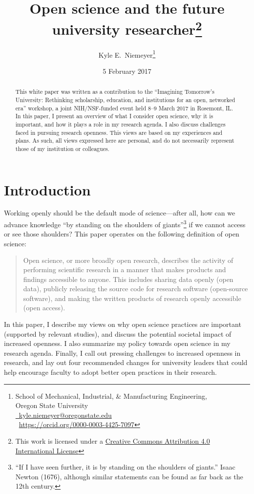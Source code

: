 \documentclass[nobib]{tufte-handout}
\title{Open science and the future university researcher\thanks{This
work is licensed under a
\href{https://creativecommons.org/licenses/by/4.0/}{Creative Commons Attribution
4.0 International License} \ccby}}
\author[Kyle E.~Niemeyer]{Kyle E.~Niemeyer\thanks{
School of Mechanical, Industrial, \& Manufacturing Engineering,\\
\noindent Oregon State University\\
\noindent \href{mailto:kyle.niemeyer@oregonstate.edu}{\faEnvelopeO{}~kyle.niemeyer@oregonstate.edu}\\
\noindent \href{https://orcid.org/}{\inlinegraphics{orcid_128x128.png}}~{\scriptsize\href{https://orcid.org/0000-0003-4425-7097}{https://orcid.org/0000-0003-4425-7097}}
}}
\date{5 February 2017} %
\begin{document}
\maketitle%

\begin{abstract}
\noindent
This white paper was written as a contribution to the ``Imagining Tomorrow's University:
Rethinking scholarship, education, and institutions for an open, networked era''
workshop, a joint NIH\slash NSF-funded event held 8--9 March 2017 in Rosemont, IL.
In this paper, I present an overview of what I consider open science,
why it is important, and how it plays a role in my research agenda.
I also discuss challenges faced in pursuing research openness.
This views are based on my experiences and plans. As such, all views expressed
here are personal, and do not necessarily represent those
of my institution or colleagues.
\end{abstract}

\section{Introduction}
\label{sec:intro}

Working openly should be the default mode of science---after all, how can
we advance knowledge ``by standing on the shoulders of giants''\footnote{``If I
have seen further, it is by standing on the shoulders of giants.'' Isaac
Newton (1676), although similar statements can be found as far back as the 12th
century.} if we cannot access or see those shoulders? This paper operates
on the following definition of open science:
\begin{quote}
Open science, or more broadly open research, describes the activity of performing
scientific research in a manner that makes products and findings accessible to
anyone. This includes sharing data openly (open data), publicly releasing the
source code for research software (open-source software), and making the written
products of research openly accessible (open access).
\end{quote}
In this paper, I describe my views on why open science practices are important
(supported by relevant studies), and discuss the potential societal impact of
increased openness. I also summarize my policy towards open science in my
research agenda. Finally, I call out pressing challenges to increased openness
in research, and lay out four recommended changes for university leaders that
could help encourage faculty to adopt better open practices in their research.
\end{document}
